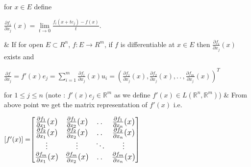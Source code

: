 \documentclass[11pt]{extarticle}
\newcommand{\R}{\mathbb{R}}
\newcommand{\ra}{\rightarrow}
\newcommand{\ck}{.\,.\,}
\newcommand{\sm}[2]{\displaystyle\sum_{#1}^{#2}}
\newcommand{\pfrac}[2]{\frac{\partial#1}{\partial#2}}
\begin{document}
\begin{multicols}{2}
\begin{easylist}
for $x\in E$ define 
\begin{center}
	{\large$\pfrac{f_i}{x_j}(x)=\lim\limits_{t\ra0}\frac{f_i(x+te_j)-f(x)}{t}.$}
\end{center}
& If for open $E\subset R^n$, $f:E\ra R^m$, if $f$ is differentiable at $x\in E$ then $\pfrac{f_i}{x_j}(x)$ exists and 
\begin{center}
	$\pfrac{f}{x_j}=f'(x)e_j=\sm{i=1}{m}\pfrac{f_i}{x_j}(x)u_i=
	\left(\pfrac{f_1}{x_j}(x),\pfrac{f_2}{x_j}(x),\ck,\pfrac{f_m}{x_j}(x)\right)^T$ 
\end{center}for $1\leq j\leq n$ (note : $f'(x)e_j\in \R^m$ as we define $f'(x)\in L(\R^n,\R^m)$)
& From above point we get the matrix representation of $f'(x)$ i.e.
\end{easylist}
 ${[f'(x)]=}
 {\large\begin{bmatrix}
 	\pfrac{f_1}{x_1}(x)&\pfrac{f_1}{x_2}(x)&\ck &\pfrac{f_1}{x_n}(x)\\
 	\pfrac{f_2}{x_1}(x)&\pfrac{f_2}{x_2}(x)&\ck&\pfrac{f_2}{x_n}(x)\\
 	\vdots&\vdots&\ddots&\vdots\\
 	\pfrac{f_m}{x_1}(x)&\pfrac{f_m}{x_2}(x)&\ck&\pfrac{f_m}{x_n}(x)\\
 \end{bmatrix}}$


\end{multicols}
\end{document}
